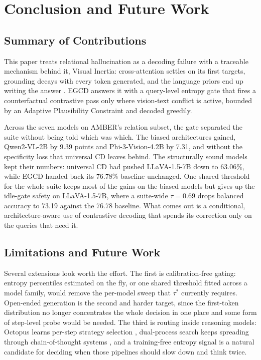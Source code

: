 \documentclass[pdflatex,sn-basic,Numbered]{sn-jnl}
\theoremstyle{thmstyleone}
\theoremstyle{thmstyletwo}
\theoremstyle{thmstylethree}
\begin{document}
\section{Conclusion and Future Work}\label{sec:conclusion}

\subsection{Summary of Contributions}\label{subsec:summary}

This paper treats relational hallucination as a decoding failure with a traceable mechanism behind it, Visual Inertia: cross-attention settles on its first targets, grounding decays with every token generated, and the language priors end up writing the answer \cite{gong2026attention}. EGCD answers it with a query-level entropy gate that fires a counterfactual contrastive pass only where vision-text conflict is active, bounded by an Adaptive Plausibility Constraint and decoded greedily.

Across the seven models on AMBER's relation subset, the gate separated the suite without being told which was which. The biased architectures gained, Qwen2-VL-2B by 9.39 points and Phi-3-Vision-4.2B by 7.31, and without the specificity loss that universal CD leaves behind. The structurally sound models kept their numbers: universal CD had pushed LLaVA-1.5-7B down to 63.06\%, while EGCD handed back its 76.78\% baseline unchanged. One shared threshold for the whole suite keeps most of the gains on the biased models but gives up the idle-gate safety on LLaVA-1.5-7B, where a suite-wide $\tau = 0.69$ drops balanced accuracy to 73.19 against the 76.78 baseline. What comes out is a conditional, architecture-aware use of contrastive decoding that spends its correction only on the queries that need it.

\subsection{Limitations and Future Work}\label{subsec:future}

Several extensions look worth the effort. The first is calibration-free gating: entropy percentiles estimated on the fly, or one shared threshold fitted across a model family, would remove the per-model sweep that $\tau^{*}$ currently requires. Open-ended generation is the second and harder target, since the first-token distribution no longer concentrates the whole decision in one place and some form of step-level probe would be needed. The third is routing inside reasoning models: Octopus learns per-step strategy selection \cite{suo2025octopus}, dual-process search keeps spreading through chain-of-thought systems \cite{cheng2025think,li2025system}, and a training-free entropy signal is a natural candidate for deciding when those pipelines should slow down and think twice.
\end{document}
